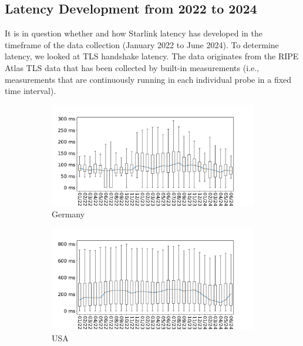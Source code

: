 \subsection{Latency Development from 2022 to 2024} \label{sec:latency-wholerange}

It is in question whether and how Starlink latency has developed in the
timeframe of the data collection (January 2022 to June 2024). To determine
latency, we looked at TLS handshake latency. The data originates from the RIPE
Atlas TLS data that has been collected by built-in measurements (i.e.,
measurements that are continuously running in each individual probe in a fixed
time interval).

\begin{figure}
	\centering
	\begin{subfigure}[b]{0.49\linewidth}
		\includegraphics[width=\linewidth]{chapters/4-results/latency/img/latency_2022_to_2024_Germany.pdf}
		\caption{Germany}
	\end{subfigure}
	\begin{subfigure}[b]{0.49\linewidth}
		\includegraphics[width=\linewidth]{chapters/4-results/latency/img/latency_2022_to_2024_United States.pdf}
		\caption{USA}
	\end{subfigure}
	\begin{subfigure}[b]{0.49\linewidth}

\end{subfigure}
\end{figure}
